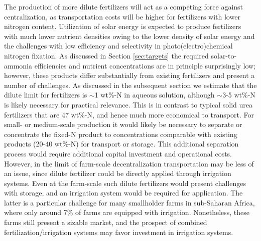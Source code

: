 The production of more dilute fertilizers will act as a competing force against centralization, as transportation costs will be higher for fertilizers with lower nitrogen content. Utilization of solar energy is expected to produce fertilizers with much lower nutrient densities owing to the lower density of solar energy and the challenges with low efficiency and selectivity in photo(electro)chemical nitrogen fixation. As discussed in Section \ref{sec:targets} the required solar-to-ammonia efficiencies and nutrient concentrations are in principle surprisingly low; however, these products differ substantially from existing fertilizers and present a number of challenges. As discussed in the subsequent section we estimate that the dilute limit for fertilizers is $\sim$1 wt\%-N in aqueous solution, although $\sim$3-5 wt\%-N is likely necessary for practical relevance. This is in contrast to typical solid urea fertilizers that are 47 wt\%-N, and hence much more economical to transport. For small- or medium-scale production it would likely be necessary to separate or concentrate the fixed-N product to concentrations comparable with existing products (20-40 wt\%-N) for transport or storage. This additional separation process would require additional capital investment and operational costs. However, in the limit of farm-scale decentralization transportation may be less of an issue, since dilute fertilizer could be directly applied through irrigation systems. Even at the farm-scale such dilute fertilizers would present challenges with storage, and an irrigation system would be required for application. The latter is a particular challenge for many smallholder farms in sub-Saharan Africa, where only around 7\% of farms are equipped with irrigation. Nonetheless, these farms still present a sizable market, and the prospect of combined fertilization/irrigation systems may favor investment in irrigation systems.

